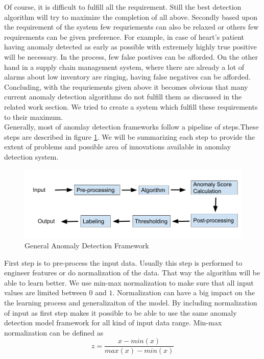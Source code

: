 \documentclass[12pt]{article}
\begin{document}
Of course, it is difficult to fulfill all the requirement. Still the best detection algorithm will try to maximize the completion of all above. Secondly based upon the requirement of the system few requriements can also be relaxed or others few requirements can be given preference. For example, in case of heart's patient having anomaly detected as early as possible with extremely highly true positive will be necessary. In the process, few false postives can be afforded. On the other hand in a supply chain management system, where there are already a lot of alarms about low inventory are ringing, having false negatives can be afforded.
Concluding, with the requriements given above it becomes obvious that many current anomaly detection algorithms do not fulfill them as discussed in the related work section. We tried to create a system which fulfill these requirements to their maximum.\\
\break
Generally, most of anomlay detection frameworks follow a pipeline of steps.These steps are described in figure \ref{generalAnomalyDetectionFrameWork}. We will be summarizing each step to provide the extent of problems and possible area of innovations available in anomlay detection system.
\begin{figure}[H]
\centering
        \includegraphics[width=\textwidth]{images/generalAnomalyDetectionFrameWork.png}
    \caption{General Anomaly Detection Framework}
    \label{generalAnomalyDetectionFrameWork}
\end{figure}
First step is to pre-process the input data. Usually this step is performed to engineer features or do normalization of the data. That way the algorithm will be able to learn better. We use min-max normalization to make sure that all input values are limited between $0$ and $1$. Normalization can have a big impact on the the learning process and generalizaiton of the model. By including normalization of input as first step makes it possible to be able to use the same anomaly detection model framework for all kind of input data range. Min-max normalization can be defined as
\begin{equation}
    z = \frac{x - min(x)}{max(x) - min(x)}
    \label{minMaxNormalization}
\end{equation}
\end{document}
